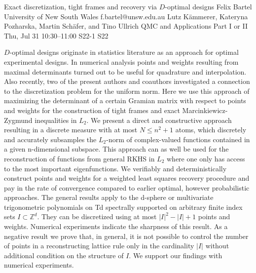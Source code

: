 \documentclass[12pt,lettersize,oneside]{book} %
\begin{document}
\begin{talk}
  {Exact discretization, tight frames and recovery via $D$-optimal designs}%
  {Felix Bartel}%
  {University of New South Wales}%
  {f.bartel@unsw.edu.au}%
  {Lutz K\"ammerer, Kateryna Pozharska, Martin Sch\"afer, and Tino Ullrich}%
  {QMC and Applications Part I or II}%
  {Thu, Jul 31 10:30--11:00}%
  {S22-1}%
  {S22}%
    
   
    $D$-optimal designs originate in statistics literature as an approach for optimal experimental designs. In numerical analysis points and weights resulting from maximal determinants turned out to be useful for quadrature and interpolation. Also recently, two of the present authors and coauthors investigated a connection to the discretization problem for the uniform norm. Here we use this approach of maximizing the determinant of a certain Gramian matrix with respect to points and weights for the construction of tight frames and exact Marcinkiewicz-Zygmund inequalities in $L_2$. We present a direct and constructive approach resulting in a discrete measure with at most $N\le n^2+1$ atoms, which discretely and accurately subsamples the $L_2$-norm of complex-valued functions contained in a given n-dimensional subspace. This approach can as well be used for the reconstruction of functions from general RKHS in $L_2$ where one only has access to the most important eigenfunctions. We verifiably and deterministically construct points and weights for a weighted least squares recovery procedure and pay in the rate of convergence compared to earlier optimal, however probabilistic approaches. The general results apply to the d-sphere or multivariate trigonometric polynomials on Td spectrally supported on arbitrary finite index sets $I\subset\mathbb Z^d$. They can be discretized using at most $|I|^2-|I|+1$ points and weights. Numerical experiments indicate the sharpness of this result. As a negative result we prove that, in general, it is not possible to control the number of points in a reconstructing lattice rule only in the cardinality $|I|$ without additional condition on the structure of $I$. We support our findings with numerical experiments.

\medskip

\end{talk}
\end{document}
